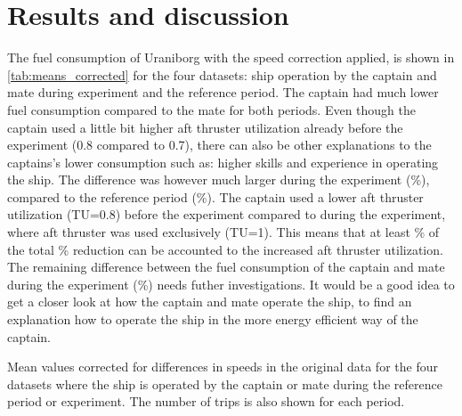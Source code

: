 \section{Results and discussion}
The fuel consumption of Uraniborg with the speed correction applied, is shown in \autoref{tab:means_corrected} for the four datasets: ship operation by the captain and mate during experiment and the reference period. The captain had much lower fuel consumption compared to the mate for both periods. Even though the captain used a little bit higher aft thruster utilization already before the experiment (0.8 compared to 0.7), there can also be other explanations to the captains's lower consumption such as: higher skills and experience in operating the ship.
The difference was however much larger during the experiment (\savingpctexperiment \%), compared to the reference period (\savingpctbeforeexperiment \%). The captain used a lower aft thruster utilization (TU=0.8) before the experiment compared to during the experiment, where aft thruster was used exclusively (TU=1). This means that at least \savingthrusterallocationpct \% of the total \savingpctexperiment \% reduction can be accounted to the increased aft thruster utilization.
The remaining difference between the fuel consumption of the captain and mate during the experiment (\savingpctbeforeexperiment \%) needs futher investigations. It would be a good idea to get a closer look at how the captain and mate operate the ship, to find an explanation how to operate the ship in the more energy efficient way of the captain.

\begin{table}[h]
    \centering
    \caption{Mean values corrected for differences in speeds in the original data for the four datasets where the ship is operated by the captain or mate during the reference period or experiment. The number of trips is also shown for each period.}
    \label{tab:means_corrected}
\end{table}
